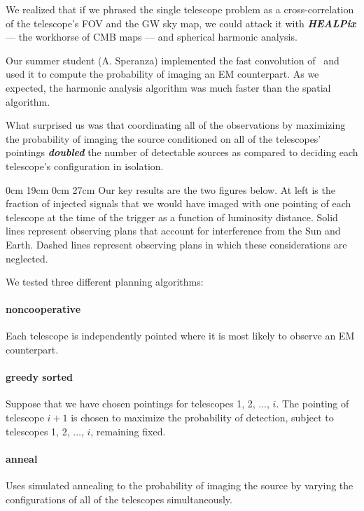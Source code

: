 \documentclass[landscape]{a0poster}
\renewcommand{\emph}[1]{{\bfseries\itshape#1}}
\begin{document}
We realized that if we phrased the single telescope problem as a cross-correlation of the telescope’s FOV and the GW sky map, we could attack it with \emph{HEALPix} --- the workhorse of CMB maps --- and spherical harmonic analysis.

Our summer student (A. Speranza) implemented the fast convolution of~\citet{Wandelt:2001p13439} and used it to compute the probability of imaging an EM counterpart.  As we expected, the harmonic analysis algorithm was much faster than the spatial algorithm.

What surprised us was that coordinating all of the observations by maximizing the probability of imaging the source conditioned on all of the telescopes’ pointings \emph{doubled} the number of detectable sources as compared to deciding each telescope’s configuration in isolation.

\framebreak

 0cm 19cm 0cm 27cm
Our key results are the two figures below.  At left is the fraction of injected signals that we would have imaged with one pointing of each telescope at the time of the trigger as a function of luminosity distance.  Solid lines represent observing plans that account for interference from the Sun and Earth.  Dashed lines represent observing plans in which these considerations are neglected.

We tested three different planning algorithms:

\paragraph{\color{red}noncooperative}
Each telescope is independently pointed where it is most likely to observe an EM counterpart.

\paragraph{\color{green!50!black}greedy sorted}
Suppose that we have chosen pointings for telescopes 1, 2, $\dots$, $i$.  The pointing of telescope $i+1$ is chosen to maximize the probability of detection, subject to telescopes 1, 2, $\dots$, $i$, remaining fixed.

\paragraph{\color{blue}anneal}
Uses simulated annealing to the probability of imaging the source by varying the configurations of all of the telescopes simultaneously.
\end{document}
